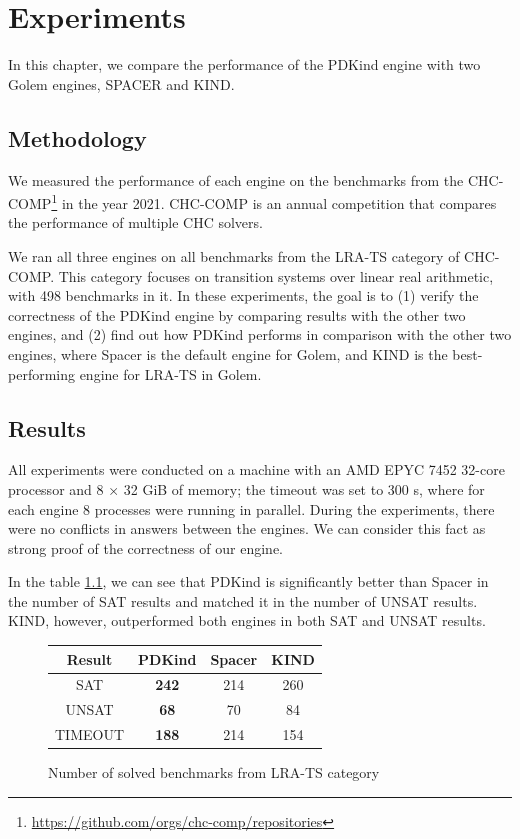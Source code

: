 \chapter{Experiments}
\noindent In this chapter, we compare the performance of the PDKind engine with two Golem engines, SPACER and KIND.

\section{Methodology}
\noindent We measured the performance of each engine on the benchmarks from the CHC-COMP\footnote{\url{https://github.com/orgs/chc-comp/repositories}} in the year 2021. CHC-COMP is an annual competition that compares the performance of multiple CHC solvers.

We ran all three engines on all benchmarks from the LRA-TS category of CHC-COMP. This category focuses on transition systems over linear real arithmetic, with 498 benchmarks in it. In these experiments, the goal is to (1) verify the correctness of the PDKind engine by comparing results with the other two engines, and (2) find out how PDKind performs in comparison with the other two engines, where Spacer is the default engine for Golem, and KIND is the best-performing engine for LRA-TS in Golem.



\section{Results}
\noindent All experiments were conducted on a machine with an AMD EPYC 7452 32-core processor and 8 × 32 GiB of memory; the timeout was set to 300 s, where for each engine 8 processes were running in parallel. During the experiments, there were no conflicts in answers between the engines. We can consider this fact as strong proof of the correctness of our engine.

In the table \ref{tab:results}, we can see that PDKind is significantly better than Spacer in the number of SAT results and matched it in the number of UNSAT results. KIND, however, outperformed both engines in both SAT and UNSAT results.


\renewcommand{\figurename}{Table}
\begin{figure}[H]
\centering
\begin{tabular}{|c|c|c|c|}
\hline
Result & \textbf{PDKind} & Spacer & KIND \\
\hline
SAT & \textbf{242} & 214 & 260 \\
\hline
UNSAT & \textbf{68} & 70 & 84 \\
\hline
TIMEOUT & \textbf{188} & 214 & 154 \\
\hline
\end{tabular}
\caption{Number of solved benchmarks from LRA-TS category} %
\label{tab:results}
\end{figure}

